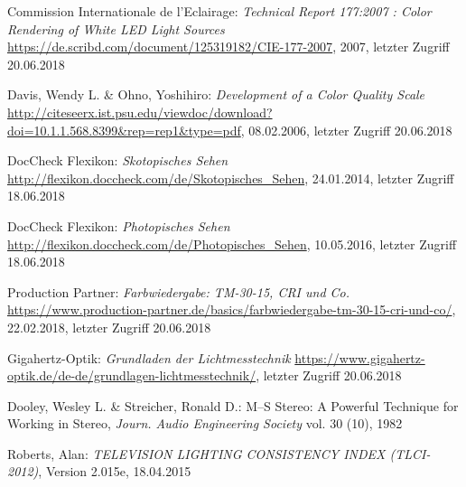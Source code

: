 \begin{thebibliography}{}



Commission Internationale de l'Eclairage:
\emph{\glqq Technical Report 177:2007 : Color Rendering of White LED Light Sources\grqq}
\url{https://de.scribd.com/document/125319182/CIE-177-2007}, 2007, letzter Zugriff 20.06.2018

Davis, Wendy L. \& Ohno, Yoshihiro:
\emph{\glqq Development of a Color Quality Scale\grqq}
\url{http://citeseerx.ist.psu.edu/viewdoc/download?doi=10.1.1.568.8399&rep=rep1&type=pdf}, 08.02.2006, letzter Zugriff 20.06.2018

DocCheck Flexikon:
\emph{\glqq Skotopisches Sehen\grqq}
\url{http://flexikon.doccheck.com/de/Skotopisches_Sehen}, 24.01.2014, letzter Zugriff 18.06.2018

DocCheck Flexikon:
\emph{\glqq Photopisches Sehen\grqq}
\url{http://flexikon.doccheck.com/de/Photopisches_Sehen}, 10.05.2016, letzter Zugriff 18.06.2018

Production Partner:
\emph{\glqq Farbwiedergabe: TM-30-15, CRI und Co.\grqq}
\url{https://www.production-partner.de/basics/farbwiedergabe-tm-30-15-cri-und-co/}, 22.02.2018, letzter Zugriff 20.06.2018


Gigahertz-Optik:
\emph{\glqq Grundladen der Lichtmesstechnik\grqq}
\url{https://www.gigahertz-optik.de/de-de/grundlagen-lichtmesstechnik/}, letzter Zugriff 20.06.2018


Dooley, Wesley L.  \& Streicher, Ronald D.:
\glqq M--S Stereo: A Powerful Technique for Working in Stereo\grqq, 
\emph{Journ. Audio Engineering Society} vol. 30 (10), 1982

Roberts, Alan: 
\emph{TELEVISION LIGHTING CONSISTENCY INDEX (TLCI-2012)}, Version 2.015e, 18.04.2015


\end{thebibliography}
